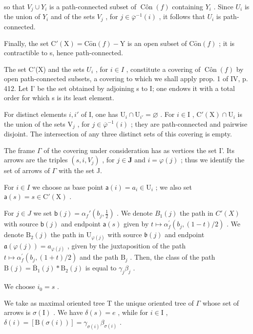 so that \(V_{j} \cup Y_{i}\) is a path-connected subset of \(\operatorname{Côn}(f)\) containing \(Y_{i}\) . Since \(U_{i}\) is the union of \(Y_{i}\) and of the sets \(V_{j}\) , for \(j \in \overline{\varphi}^{-1}(i)\) , it follows that \(U_{i}\) is path-connected.

Finally, the set \(\mathrm{C}'(\mathrm{X}) = \mathrm{C}\hat{\mathrm{o}}\mathrm{n}(f) - \mathrm{Y}\) is an open subset of \(\mathrm{C}\hat{\mathrm{o}}\mathrm{n}(f)\) ; it is contractible to s, hence path-connected.

The set C'(X) and the sets \(U_{i}\) , for \(i \in I\) , constitute a covering of \(\operatorname{Côn}(f)\) by open path-connected subsets, a covering to which we shall apply prop. 1 of IV, p. 412. Let I' be the set obtained by adjoining s to I; one endows it with a total order for which s is its least element.

For distinct elements \(i, i'\) of I, one has \(\mathrm{U}_{i} \cap \mathrm{U}_{i'} = \varnothing\) . For \(i \in \mathrm{I}\) , \(\mathrm{C}'(\mathrm{X}) \cap \mathrm{U}_{i}\) is the union of the sets \(\mathrm{V}_{j}\) , for \(j \in \overline{\varphi}^{-1}(i)\) ; they are path-connected and pairwise disjoint. The intersection of any three distinct sets of this covering is empty.

The frame \(\Gamma\) of the covering under consideration has as vertices the set I'. Its arrows are the triples \((s, i, V_j)\) , for \(j \in \mathbf{J}\) and \(i = \varphi(j)\) ; thus we identify the set of arrows of \(\Gamma\) with the set J.

For \(i \in I\) we choose as base point \(\mathsf{a}(i) = a_i \in \mathrm{U}_i\) ; we also set \(\mathsf{a}(s) = s \in \mathrm{C}'(\mathrm{X})\) .

For \(j \in J\) we set \(\mathsf{b}(j) = \alpha_f'(b_j, \frac{1}{2})\) . We denote \(B_1(j)\) the path in \(C'(X)\) with source \(\mathsf{b}(j)\) and endpoint \(\mathsf{a}(s)\) given by \(t \mapsto \alpha_{f}^{\prime}(b_{j}, (1 - t)/2)\) . We denote \(\mathrm{B}_{2}(j)\) the path in \(\mathrm{U}_{\varphi(j)}\) with source \(\mathfrak{b}(j)\) and endpoint \(\mathfrak{a}(\varphi(j)) = a_{\varphi(j)}\) , given by the juxtaposition of the path \(t \mapsto \alpha_{f}^{\prime}(b_{j}, (1 + t)/2)\) and the path \(\mathrm{B}_{j}\) . Then, the class of the path \(\mathrm{B}(j) = \overline{\mathrm{B}}_{1}(j) * \mathrm{B}_{2}(j)\) is equal to \(\gamma_{j}\beta_{j}\) .

We choose \(i_{0}=s\) .

We take as maximal oriented tree T the unique oriented tree of \(\Gamma\) whose set of arrows is \(\sigma(\mathrm{I})\) . We have \(\delta(s) = e\) , while for \(i \in \mathrm{I}\) , \(\delta(i) = [\mathrm{B}(\sigma(i))] = \gamma_{\sigma(i)}\beta_{\sigma(i)}\) .

